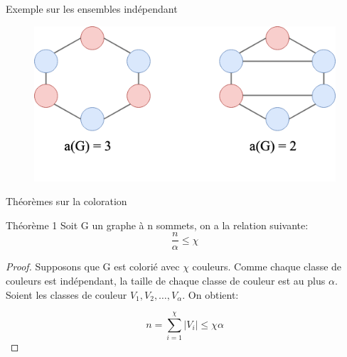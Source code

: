 \documentclass[10pt,xcolor=dvipsnames]{beamer}
\newcommand{\defin}[1]{\textcolor{darkspringgreen}{#1}}
\begin{document}
\begin{frame}{Exemple sur les ensembles indépendant}
{    \begin{figure}
        \centering
        \includegraphics[scale=0.5]{figures/CM3/graph-stable-4.png}
        \label{fig:my_label}
    \end{figure}
    }
\end{frame}

\begin{frame}{Théorèmes sur la coloration}
    \begin{exampleblock}{Théorème 1}
        Soit G un graphe à n sommets, on a la relation suivante:
        \begin{equation*}
            \frac{n}{\alpha} \leq \chi
        \end{equation*}
        
        \begin{proof}
            Supposons que G est colorié avec $\chi$ couleurs. Comme chaque \defin{classe de couleurs} est indépendant, la taille de chaque classe de couleur est au plus $\alpha$. Soient les classes de couleur $V_1, V_2, \ldots,  V_\alpha$. On obtient:
            
            \begin{equation*}
                n = \sum_{i=1}^\chi |V_i| \leq \chi \alpha 
            \end{equation*}
        \end{proof}
    \end{exampleblock}
\end{frame}
\end{document}
